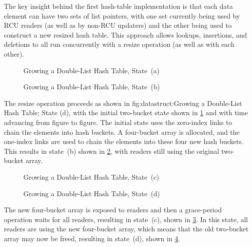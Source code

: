 The key insight behind the first hash-table implementation is that
each data element can have two sets of list pointers, with one set
currently being used by RCU readers (as well as by non-RCU updaters)
and the other being used to construct a new resized hash table.
This approach allows lookups, insertions, and deletions to all run
concurrently with a resize operation (as well as with each other).

\begin{figure}[tb]
\centering
{}
\caption{Growing a Double-List Hash Table, State~(a)}
\label{fig:datastruct:Growing a Double-List Hash Table; State (a)}
\end{figure}

\begin{figure}[tb]
\centering
{}
\caption{Growing a Double-List Hash Table, State~(b)}
\label{fig:datastruct:Growing a Double-List Hash Table; State (b)}
\end{figure}

The resize operation proceeds as shown in
{fig:datastruct:Growing a Double-List Hash Table; State (d)},
with the initial two-bucket state shown in
\cref{fig:datastruct:Growing a Double-List Hash Table; State (a)}
and with time advancing from figure to figure.
The initial state uses the zero-index links to chain the elements into
hash buckets.
A four-bucket array is allocated, and the one-index links are used to
chain the elements into these four new hash buckets.
This results in state~(b) shown in
\cref{fig:datastruct:Growing a Double-List Hash Table; State (b)},
with readers still using the original two-bucket array.

\begin{figure}[tb]
\centering
{}
\caption{Growing a Double-List Hash Table, State~(c)}
\label{fig:datastruct:Growing a Double-List Hash Table; State (c)}
\end{figure}

\begin{figure}[tb]
\centering
{}
\caption{Growing a Double-List Hash Table, State~(d)}
\label{fig:datastruct:Growing a Double-List Hash Table; State (d)}
\end{figure}

The new four-bucket array is exposed to readers and then a grace-period
operation waits for all readers, resulting in state~(c), shown in
\cref{fig:datastruct:Growing a Double-List Hash Table; State (c)}.
In this state, all readers are using the new four-bucket array,
which means that the old two-bucket array may now be freed, resulting
in state~(d), shown in
\cref{fig:datastruct:Growing a Double-List Hash Table; State (d)}.


